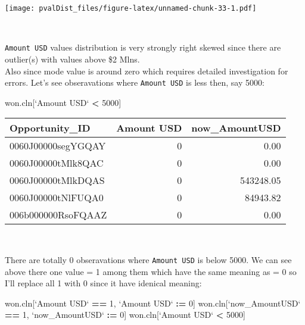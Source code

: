 \documentclass[]{article}
\newenvironment{Shaded}{\begin{snugshade}}{\end{snugshade}}
\newcommand{\DataTypeTok}[1]{\textcolor[rgb]{0.13,0.29,0.53}{#1}}
\newcommand{\DecValTok}[1]{\textcolor[rgb]{0.00,0.00,0.81}{#1}}
\newcommand{\ErrorTok}[1]{\textcolor[rgb]{0.64,0.00,0.00}{\textbf{#1}}}
\newcommand{\NormalTok}[1]{#1}
\newcommand{\OperatorTok}[1]{\textcolor[rgb]{0.81,0.36,0.00}{\textbf{#1}}}
\newcommand{\StringTok}[1]{\textcolor[rgb]{0.31,0.60,0.02}{#1}}
\begin{document}
\texttt{[image: pvalDist\_files/figure-latex/unnamed-chunk-33-1.pdf]}

~

\texttt{Amount\ USD} values distribution is very strongly right skewed
since there are outlier(s) with values above \$2 Mlns.\\
Also since mode value is around zero which requires detailed
investigation for errors. Let's see obseravations where
\texttt{Amount\ USD} is less then, say 5000:

\begin{Shaded}
\begin{Highlighting}[]
\NormalTok{won.cln[}\StringTok{`}\DataTypeTok{Amount USD}\StringTok{`} \OperatorTok{<}\StringTok{ }\DecValTok{5000}\NormalTok{]}
\end{Highlighting}
\end{Shaded}

\begin{tabular}{l|r|r}
\hline
Opportunity\_ID & Amount USD & now\_AmountUSD\\
\hline
0060J00000segYGQAY & 0 & 0.00\\
\hline
0060J00000tMlk8QAC & 0 & 0.00\\
\hline
0060J00000tMlkDQAS & 0 & 543248.05\\
\hline
0060J00000tNlFUQA0 & 0 & 84943.82\\
\hline
006b000000RsoFQAAZ & 0 & 0.00\\
\hline
\end{tabular}

~

There are totally 0 obseravations where \texttt{Amount\ USD} is below
5000. We can see above there one value = 1 among them which have the
same meaning as = 0 so I'll replace all 1 with 0 since it have idenical
meaning:

\begin{Shaded}
\begin{Highlighting}[]
\NormalTok{won.cln[}\StringTok{`}\DataTypeTok{Amount USD}\StringTok{`} \OperatorTok{==}\StringTok{ }\DecValTok{1}\NormalTok{, }\StringTok{`}\DataTypeTok{Amount USD}\StringTok{`} \OperatorTok{:}\ErrorTok{=}\StringTok{ }\DecValTok{0}\NormalTok{]}
\NormalTok{won.cln[}\StringTok{`}\DataTypeTok{now_AmountUSD}\StringTok{`} \OperatorTok{==}\StringTok{ }\DecValTok{1}\NormalTok{, }\StringTok{`}\DataTypeTok{now_AmountUSD}\StringTok{`} \OperatorTok{:}\ErrorTok{=}\StringTok{ }\DecValTok{0}\NormalTok{]}
\NormalTok{won.cln[}\StringTok{`}\DataTypeTok{Amount USD}\StringTok{`} \OperatorTok{<}\StringTok{ }\DecValTok{5000}\NormalTok{]}
\end{Highlighting}
\end{Shaded}
\end{document}
